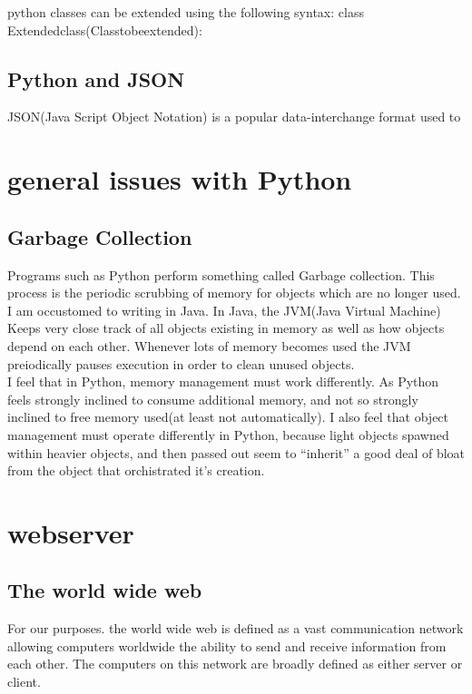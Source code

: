 python classes can be extended using the following syntax:
    class Extendedclass(Classtobeextended):

\subsection{Python and JSON}
JSON(Java Script Object Notation) is a popular data-interchange format used to


\section{general issues with Python}

\subsection{Garbage Collection}

Programs such as Python perform something called Garbage collection.  This process is the periodic scrubbing of memory for objects which are no longer used.\\
I am occustomed to writing in Java.  In Java, the JVM(Java Virtual Machine) Keeps very close track of all objects existing in memory as well as how objects depend on each other.  Whenever lots of memory becomes used the JVM preiodically pauses execution in order to clean unused objects.\\
I feel that in Python, memory management must work differently.  As Python feels strongly inclined to consume additional memory, and not so strongly inclined to free memory used(at least not automatically).  I also feel that object management must operate differently in Python, because light objects spawned within heavier objects, and then passed out seem to ``inherit'' a good deal of bloat from the object that orchistrated it's creation.



\section{webserver}

\subsection{The world wide web}

For our purposes. the world wide web is defined as a vast communication network allowing computers worldwide the ability to send and receive information from each other.  The computers on this network are broadly defined as either server or client.

